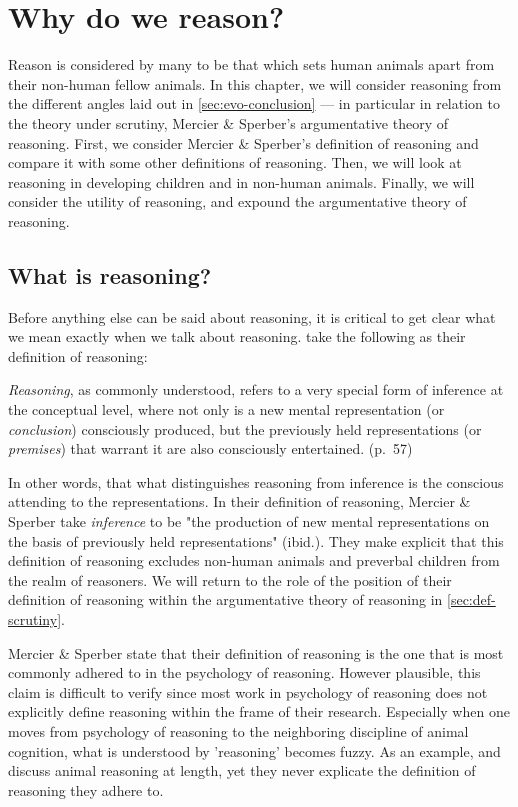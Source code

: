 \chapter{Why do we reason?}
\label{ch:reasoning}

Reason is considered by many to be that which sets human animals apart from their non-human fellow animals. In this chapter, we will consider reasoning from the different angles laid out in \cref{sec:evo-conclusion} --- in particular in relation to the theory under scrutiny, Mercier \& Sperber's argumentative theory of reasoning. First, we consider Mercier \& Sperber's definition of reasoning and compare it with some other definitions of reasoning. Then, we will look at reasoning in developing children and in non-human animals. Finally, we will consider the utility of reasoning, and expound the argumentative theory of reasoning.

\section{What is reasoning?}
\label{sec:reasoning-def}


Before anything else can be said about reasoning, it is critical to get clear what we mean exactly when we talk about reasoning. \citet{MS11} take the following as their definition of reasoning:

\begin{quoting}
    \emph{Reasoning}, as commonly understood, refers to a very special form of inference at the conceptual level, where not only is a new mental representation (or \emph{conclusion}) consciously produced, but the previously held representations (or \emph{premises}) that warrant it are also consciously entertained.
    \hfill (p.~57)
\end{quoting}
In other words, that what distinguishes reasoning from inference is the conscious attending to the representations.
In their definition of reasoning, Mercier \& Sperber take \emph{inference} to be "the production of new mental representations on the basis of previously held representations" (ibid.). They make explicit that this definition of reasoning excludes non-human animals and preverbal children from the realm of reasoners.
We will return to the role of the position of their definition of reasoning within the argumentative theory of reasoning in \cref{sec:def-scrutiny}.

Mercier \& Sperber state that their definition of reasoning is the one that is most commonly adhered to in the psychology of reasoning. However plausible, this claim is difficult to verify since most work in psychology of reasoning does not explicitly define reasoning within the frame of their research. Especially when one moves from psychology of reasoning to the neighboring discipline of animal cognition, what is understood by 'reasoning' becomes fuzzy. As an example, \citet{Andrews15} and \citet{Call06} discuss animal reasoning at length, yet they never explicate the definition of reasoning they adhere to.

